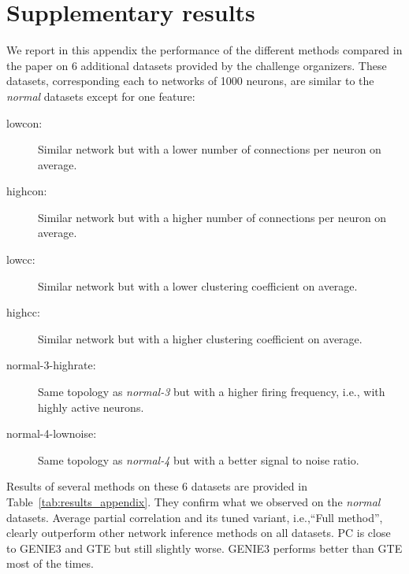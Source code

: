 \documentclass[wcp]{jmlr}
\begin{document}
\section{Supplementary results} \label{app:supp}

We report in this appendix the performance of the different methods compared
in the paper on 6 additional datasets provided by the challenge
organizers. These datasets, corresponding each to networks of 1000 neurons, are similar to
the \textit{normal} datasets except for one feature:
\begin{description}
\item[lowcon:] Similar network but with a lower number of connections per neuron on average.
\item[highcon:] Similar network but with a higher number of connections per neuron on average.
\item[lowcc:] Similar network but with a lower clustering coefficient on average.
\item[highcc:] Similar network but with a higher clustering coefficient on average.
\item[normal-3-highrate:] Same topology as \textit{normal-3} but with a higher firing frequency, i.e., with highly active neurons.
\item[normal-4-lownoise:] Same topology as \textit{normal-4} but with a better signal to noise ratio.
\end{description}

Results of several methods on these 6 datasets are provided in
Table~\ref{tab:results_appendix}. They confirm what we observed on the
\textit{normal} datasets. Average partial correlation and its tuned variant,
i.e.,``Full method'', clearly outperform other network inference methods on all
datasets. PC is close to GENIE3 and GTE but still slightly worse. GENIE3
performs better than GTE most of the times.
\end{document}
